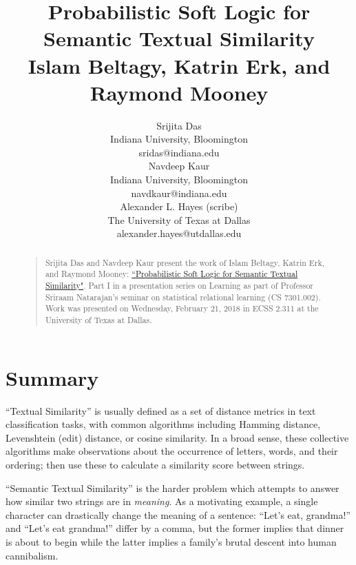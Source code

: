 \documentclass[letterpaper]{article}
\begin{document}
%
\title{Probabilistic Soft Logic for Semantic Textual Similarity\\
\large Islam Beltagy, Katrin Erk, and Raymond Mooney
}
\author{Srijita Das\\
Indiana University, Bloomington\\
sridas@indiana.edu\\
\And
Navdeep Kaur\\
Indiana University, Bloomington\\
navdkaur@indiana.edu\\
\And
Alexander L. Hayes (scribe)\\
The University of Texas at Dallas\\
alexander.hayes@utdallas.edu
}

\maketitle
\begin{abstract}
\begin{quote}
Srijita Das and Navdeep Kaur present the work of Islam Beltagy, Katrin Erk, and Raymond Mooney: \href{https://www.cs.utexas.edu/~ml/papers/beltagy.acl14.pdf}{``Probabilistic Soft Logic for Semantic Textual Similarity"}. Part I in a presentation series on Learning as part of Professor Sriraam Natarajan's seminar on statistical relational learning (CS 7301.002). Work was presented on Wednesday, February 21, 2018 in ECSS 2.311 at the University of Texas at Dallas.
\end{quote}
\end{abstract}

\section{Summary}

``Textual Similarity'' is usually defined as a set of distance metrics in text classification tasks, with common algorithms including Hamming distance, Levenshtein (edit) distance, or cosine similarity. In a broad sense, these collective algorithms make observations about the occurrence of letters, words, and their ordering; then use these to calculate a similarity score between strings.

``Semantic Textual Similarity'' is the harder problem which attempts to answer how similar two strings are in \textit{meaning}. As a motivating example, a single character can drastically change the meaning of a sentence: ``Let's eat, grandma!'' and ``Let's eat grandma!'' differ by a comma, but the former implies that dinner is about to begin while the latter implies a family's brutal descent into human cannibalism.
\end{document}
